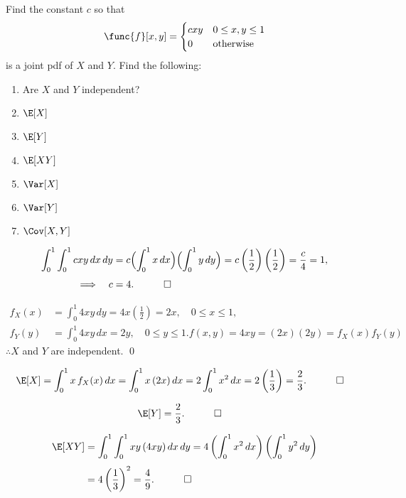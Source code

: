\begin{hwkProblem}{1}{}

	Find the constant \( c \) so that
	\[
		\func{f}[x, y] = \begin{cases}
		cxy &  0 \leq x, y \leq 1 \\
		0 & \text{otherwise}
		\end{cases}
	\]
	is a joint pdf of \( X \) and \( Y \). Find the following:
	\begin{enumerate}
		\item Are \( X \) and \( Y \) independent?
		\item \( \E[X] \)
		\item \( \E[Y] \)
		\item \( \E[XY] \)
		\item \( \Var[X] \)
		\item \( \Var[Y] \)
		\item \( \Cov[X, Y] \)
	\end{enumerate}

	\hwkSol
	\begin{align*}
		\int_0^1\int_0^1 cxy\,dx\,dy 
		&= c\Bigl(\int_0^1 x\,dx\Bigr)\Bigl(\int_0^1 y\,dy\Bigr)
		= c\left(\frac{1}{2}\right)\left(\frac{1}{2}\right)
		= \frac{c}{4} = 1,\\[1mm]
		\Longrightarrow\quad c &= 4. \quad \qed
	\end{align*}

	\hwkPart
	\begin{align*}
		f_X(x) &= \int_0^1 4xy\,dy = 4x\left(\frac{1}{2}\right)=2x,\quad 0\le x\le 1,\\[1mm]
		f_Y(y) &= \int_0^1 4xy\,dx = 2y,\quad 0\le y\le 1.
		f(x,y)=4xy=(2x)(2y)=f_X(x)f_Y(y)
	\end{align*}
	\( \therefore X \) and \( Y \) are independent. \qed

	\hwkPart
	\begin{align*}
		\E[X] &= \int_0^1 x\, f_X(x)\,dx 
		= \int_0^1 x\,(2x)\,dx 
		= 2\int_0^1 x^2\,dx 
		= 2\left(\frac{1}{3}\right)=\frac{2}{3}. \quad \qed
	\end{align*}

	\hwkPart
	\begin{align*}
		\E[Y] &= \frac{2}{3}. \quad \qed
	\end{align*}

	\hwkPart
	\begin{align*}
		\E[XY] &= \int_0^1\int_0^1 xy\,(4xy)\,dx\,dy 
		= 4\left(\int_0^1 x^2\,dx\right)\left(\int_0^1 y^2\,dy\right)\\[1mm]
		       &= 4\left(\frac{1}{3}\right)^2
		       = \frac{4}{9}. \quad \qed
	\end{align*}


\end{hwkProblem}
